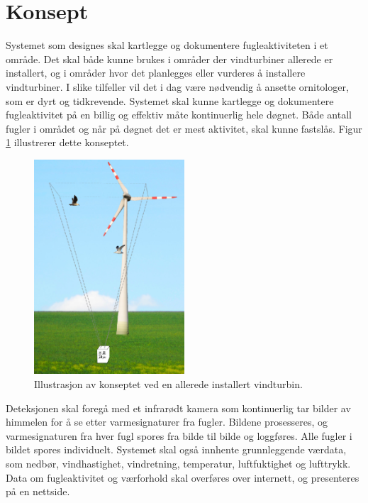 \section{Konsept}
\label{sec:konsept}

Systemet som designes skal kartlegge og dokumentere fugleaktiviteten i et område. 
Det skal både kunne brukes i områder der vindturbiner allerede er installert, og i områder hvor det planlegges eller vurderes å installere vindturbiner. 
I slike tilfeller vil det i dag være nødvendig å ansette ornitologer, som er dyrt og tidkrevende. 
Systemet skal kunne kartlegge og dokumentere fugleaktivitet på en billig og effektiv måte kontinuerlig hele døgnet. 
Både antall fugler i området og når på døgnet det er mest aktivitet, skal kunne fastslås. Figur \ref{fig:konsept} illustrerer dette konseptet.



\begin{figure}[H]
    \centering
    \includegraphics[width=0.5\textwidth]{konsept/KonseptBilde.png}
    \caption{Illustrasjon av konseptet ved en allerede installert vindturbin.}
    \label{fig:konsept}
\end{figure}


Deteksjonen skal foregå med et infrarødt kamera som kontinuerlig tar bilder av himmelen for å se etter varmesignaturer fra fugler. 
Bildene prosesseres, og varmesignaturen fra hver fugl spores fra bilde til bilde og loggføres. 
Alle fugler i bildet spores individuelt. 
Systemet skal også innhente grunnleggende værdata, som nedbør, vindhastighet, vindretning, temperatur, luftfuktighet og lufttrykk. 
Data om fugleaktivitet og værforhold skal overføres over internett, og presenteres på en nettside.






